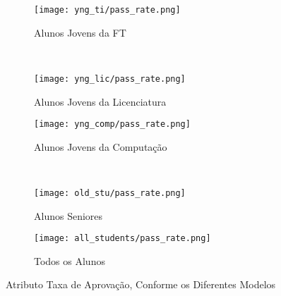 \clearpage
\begin{figure}[!ht]
    \centering
    \begin{subfigure}[b]{0.48\textwidth}
        \centering
        \texttt{[image: yng\_ti/pass\_rate.png]}
        \caption{Alunos Jovens da FT}
    \end{subfigure}
    ~
    \begin{subfigure}[b]{0.48\textwidth}
        \centering
        \texttt{[image: yng\_lic/pass\_rate.png]}
        \caption{Alunos Jovens da Licenciatura}
    \end{subfigure}

    \begin{subfigure}[b]{0.48\textwidth}
        \centering
        \texttt{[image: yng\_comp/pass\_rate.png]}
        \caption{Alunos Jovens da Computação}
    \end{subfigure}
    ~
    \begin{subfigure}[b]{0.48\textwidth}
        \centering
        \texttt{[image: old\_stu/pass\_rate.png]}
        \caption{Alunos Seniores}
    \end{subfigure}

    \begin{subfigure}[b]{0.48\textwidth}
        \centering
        \texttt{[image: all\_students/pass\_rate.png]}
        \caption{Todos os Alunos}
    \end{subfigure}
    \caption{Atributo Taxa de Aprovação, Conforme os Diferentes Modelos}
\end{figure}

